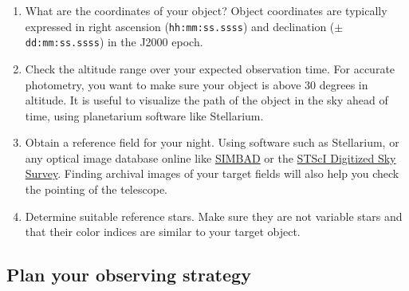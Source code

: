 \documentclass{article}
\begin{document}
	\begin{enumerate}
		
		\item What are the coordinates of your object? Object coordinates are typically expressed in right ascension (\texttt{hh:mm:ss.ssss}) and declination (\texttt{$\pm$dd:mm:ss.ssss}) in the J2000 epoch.
		
		\item Check the altitude range over your expected observation time. For accurate photometry, you want to make sure your object is above 30 degrees in altitude. It is useful to visualize the path of the object in the sky ahead of time, using planetarium software like Stellarium.
		
		\item Obtain a reference field for your night. Using software such as Stellarium, or any optical image database online like \href{http://simbad.u-strasbg.fr/simbad/}{SIMBAD} or the \href{https://archive.stsci.edu/cgi-bin/dss_form}{STScI Digitized Sky Survey}. Finding archival images of your target fields will also help you check the pointing of the telescope.
		
		\item Determine suitable reference stars. Make sure they are not variable stars and that their color indices are similar to your target object.
		
	\end{enumerate}
	
	\subsection{Plan your observing strategy}
	\label{sec:plan-your-observing-strategy}
	
\end{document}
